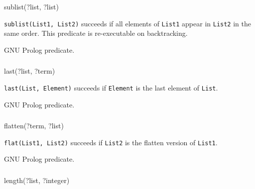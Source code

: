 \begin{TemplatesOneCol}
sublist(?list, ?list)

\end{TemplatesOneCol}

\Description

\texttt{sublist(List1, List2)} succeeds if all elements of \texttt{List1} appear in \texttt{List2} in the same order. This predicate is re-executable on backtracking.

\PlErrorsNone

\Portability

GNU Prolog predicate.

\subsubsection{}

\begin{TemplatesOneCol}
last(?list, ?term)

\end{TemplatesOneCol}

\Description

\texttt{last(List, Element)} succeeds if \texttt{Element} is the last element
of \texttt{List}.

\PlErrorsNone

\Portability

GNU Prolog predicate.

\subsubsection{}

\begin{TemplatesOneCol}
flatten(?term, ?list)

\end{TemplatesOneCol}

\Description

\texttt{flat(List1, List2)} succeeds if \texttt{List2} is the flatten version
of \texttt{List1}.

\PlErrorsNone

\Portability

GNU Prolog predicate.

\subsubsection{}

\begin{TemplatesOneCol}
length(?list, ?integer)

\end{TemplatesOneCol}

